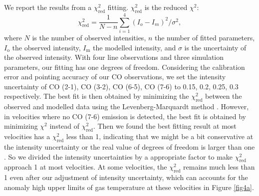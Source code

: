 We report the results from a $\chi^2_{\mathrm{red}}$ fitting. $\chi^2_{\mathrm{red}}$ is the reduced $\chi^2$: 
\begin{equation}
\chi^2_{\mathrm{red}} = \frac{1}{N - n} \sum_{i=1}^{4}(I_o - I_m)^2/\sigma^2,
\end{equation}
where $N$ is the number of observed intensities, $n$ the number of fitted parameters, $I_\mathrm{o}$ the observed intensity, $I_\mathrm{m}$ the modelled intensity, and $\sigma$ is the uncertainty of the observed intensity. With four line observations and three simulation parameters, our fitting has one degrees of freedom. Considering the calibration error and pointing accuracy of our CO observations, we set the intensity uncertainty of CO (2-1), CO (3-2), CO (6-5), CO (7-6) to 0.15, 0.2, 0.25, 0.3 respectively. The best fit is then obtained by minimizing the $\chi^2_{\mathrm{red}}$ between the observed and modelled data using the Levenberg-Marquardt method \citep{1992nrfa.book.....P}. However, in velocities where no CO (7-6) emission is detected, the best fit is obtained by minimizing $\chi^2$ instead of $\chi^2_{\mathrm{red}}$. Then we found the best fitting result at most velocities has a $\chi^2_{\mathrm{red}}$ less than 1, indicating that we might be a bit conservative at the intensity uncertainty or the real value of degrees of freedom is larger than one \citep{2010arXiv1012.3754A}. So we divided the intensity uncertainties by a appropriate factor to make $\chi^2_{\mathrm{red}}$ approach 1 at most velocities. At some velocities, the $\chi_{\mathrm{red}}^2$ remains much less than 1 even after our adjustment of intensity uncertainty, which can accounts for the anomaly high upper limits of gas temperature at these velocities in Figure \ref{fig4a}. 

